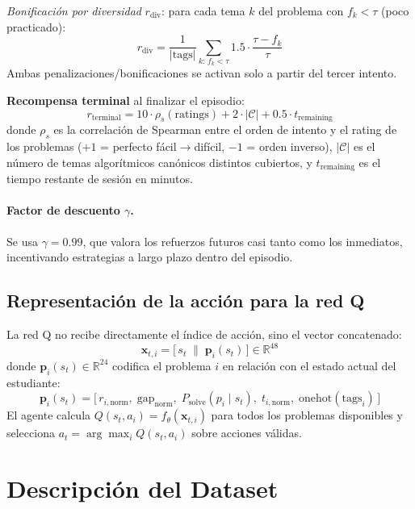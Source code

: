 \documentclass[12pt, a4paper]{article}
\begin{document}
\textit{Bonificación por diversidad} $r_{\text{div}}$: para cada tema $k$
del problema con $f_k < \tau$ (poco practicado):
\[
  r_{\text{div}} = \frac{1}{|\text{tags}|}\sum_{k:\, f_k < \tau}
    1.5 \cdot \frac{\tau - f_k}{\tau}
\]
Ambas penalizaciones/bonificaciones se activan solo a partir del tercer intento.
 
\textbf{Recompensa terminal} al finalizar el episodio:
\[
  r_{\text{terminal}} = 10 \cdot \rho_s(\text{ratings}) + 2 \cdot |\mathcal{C}|
  + 0.5 \cdot t_{\text{remaining}}
\]
donde $\rho_s$ es la correlación de Spearman entre el orden de intento y el
rating de los problemas ($+1$ = perfecto fácil$\to$difícil, $-1$ = orden
inverso), $|\mathcal{C}|$ es el número de temas algorítmicos canónicos
distintos cubiertos, y $t_{\text{remaining}}$ es el tiempo restante de sesión
en minutos.
 
\paragraph{Factor de descuento $\gamma$.}
Se usa $\gamma = 0.99$, que valora los refuerzos futuros casi tanto como
los inmediatos, incentivando estrategias a largo plazo dentro del episodio.
 
\subsection{Representación de la acción para la red Q}
 
La red Q no recibe directamente el índice de acción, sino el vector concatenado:
\[
  \mathbf{x}_{t,i} = \bigl[\,s_t \;\|\; \mathbf{p}_i(s_t)\,\bigr] \in \mathbb{R}^{48}
\]
donde $\mathbf{p}_i(s_t) \in \mathbb{R}^{24}$ codifica el problema $i$ en
relación con el estado actual del estudiante:
\[
  \mathbf{p}_i(s_t) = \bigl[\,r_{i,\text{norm}},\; \text{gap}_{\text{norm}},\;
  P_{\text{solve}}(p_i \mid s_t),\; t_{i,\text{norm}},\;
  \text{onehot}(\text{tags}_i)\,\bigr]
\]
El agente calcula $Q(s_t, a_i) = f_\theta(\mathbf{x}_{t,i})$ para todos los
problemas disponibles y selecciona $a_t = \arg\max_i Q(s_t, a_i)$ sobre
acciones válidas.


\section{Descripción del Dataset}
\end{document}
